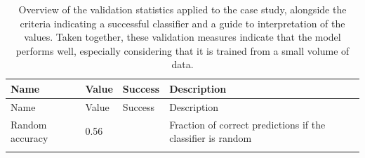 \documentclass[10pt,oneside]{article}
\begin{document}
\hypertarget{tbl:validation}{}
\begin{longtable}[]{@{}llll@{}}
\caption{\label{tbl:validation}Overview of the validation statistics
applied to the case study, alongside the criteria indicating a
successful classifier and a guide to interpretation of the values. Taken
together, these validation measures indicate that the model performs
well, especially considering that it is trained from a small volume of
data.}\tabularnewline
\toprule
\begin{minipage}[b]{0.21\columnwidth}\raggedright
Name\strut
\end{minipage} & \begin{minipage}[b]{0.05\columnwidth}\raggedright
Value\strut
\end{minipage} & \begin{minipage}[b]{0.13\columnwidth}\raggedright
Success\strut
\end{minipage} & \begin{minipage}[b]{0.49\columnwidth}\raggedright
Description\strut
\end{minipage}\tabularnewline
\midrule
\endfirsthead
\toprule
\begin{minipage}[b]{0.21\columnwidth}\raggedright
Name\strut
\end{minipage} & \begin{minipage}[b]{0.05\columnwidth}\raggedright
Value\strut
\end{minipage} & \begin{minipage}[b]{0.13\columnwidth}\raggedright
Success\strut
\end{minipage} & \begin{minipage}[b]{0.49\columnwidth}\raggedright
Description\strut
\end{minipage}\tabularnewline
\midrule
\endhead
\begin{minipage}[t]{0.21\columnwidth}\raggedright
Random accuracy\strut
\end{minipage} & \begin{minipage}[t]{0.05\columnwidth}\raggedright
0.56\strut
\end{minipage} & \begin{minipage}[t]{0.13\columnwidth}\raggedright
\strut
\end{minipage} & \begin{minipage}[t]{0.49\columnwidth}\raggedright
Fraction of correct predictions if the classifier is random\strut
\end{minipage}\tabularnewline
\begin{minipage}[t]{0.21\columnwidth}\raggedright

\end{minipage}
\end{longtable}
\end{document}
